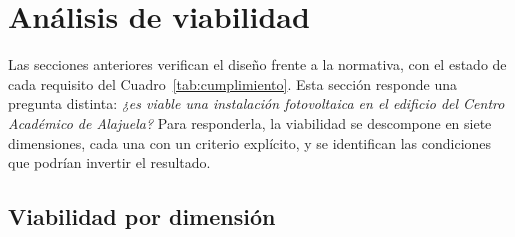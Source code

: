 \documentclass[12pt]{article}
\begin{document}
\section{Análisis de viabilidad}
\label{sec:viabilidad}
Las secciones anteriores verifican el diseño frente a la normativa, con el estado de cada requisito del Cuadro~\ref{tab:cumplimiento}. Esta sección responde una pregunta distinta: \emph{¿es viable una instalación fotovoltaica en el edificio del Centro Académico de Alajuela?} Para responderla, la viabilidad se descompone en siete dimensiones, cada una con un criterio explícito, y se identifican las condiciones que podrían invertir el resultado.

\subsection{Viabilidad por dimensión}
\end{document}
